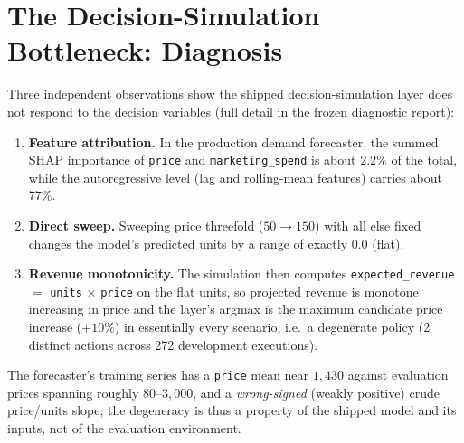 \documentclass[conference]{IEEEtran}
\newcommand{\code}[1]{\texttt{#1}}
\begin{document}
\section{The Decision-Simulation Bottleneck: Diagnosis}\label{sec:diag}
Three independent observations show the shipped decision-simulation layer does
not respond to the decision variables (full detail in the frozen diagnostic
report):
\begin{enumerate}
  \item \textbf{Feature attribution.} In the production demand forecaster, the
        summed SHAP importance of \code{price} and \code{marketing\_spend} is
        about $2.2\%$ of the total, while the autoregressive level (lag and
        rolling-mean features) carries about $77\%$.
  \item \textbf{Direct sweep.} Sweeping price threefold ($50\to150$) with all
        else fixed changes the model's predicted units by a range of exactly
        $0.0$ (flat).
  \item \textbf{Revenue monotonicity.} The simulation then computes
        \code{expected\_revenue} $=$ \code{units} $\times$ \code{price} on the
        flat units, so projected revenue is monotone increasing in price and the
        layer's argmax is the maximum candidate price increase ($+10\%$) in
        essentially every scenario, i.e.\ a degenerate policy (2 distinct
        actions across 272 development executions).
\end{enumerate}
The forecaster's training series has a \code{price} mean near $1{,}430$ against
evaluation prices spanning roughly $80$--$3{,}000$, and a \emph{wrong-signed}
(weakly positive) crude price/units slope; the degeneracy is thus a property of
the shipped model and its inputs, not of the evaluation environment.

\end{document}
